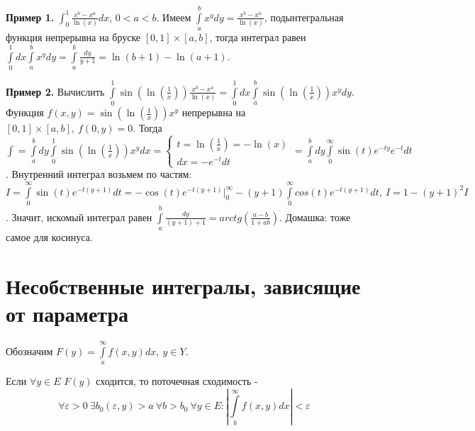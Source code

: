 \textbf{Пример 1.} $\int_{0}^{1} \frac{x^b-x^a}{\ln(x)}dx$, $0<a<b$.  
Имеем $\int\limits_{a}^{b} x^ydy=\frac{x^b-x^a}{\ln(x)}$, 
подынтегральная функция непрерывна на бруске $[0,1]\times[a,b]$, 
тогда интеграл равен $\int\limits_{0}^{1}dx\int\limits_{a}^{b}x^ydy=
\int\limits_{a}^{b}\frac{dy}{y+1}=\ln(b+1)-\ln(a+1)$.

\textbf{Пример 2.} Вычислить $\int\limits_{0}^{1}\sin(\ln(\frac{1}{x}))
\frac{x^b-x^a}{\ln(x)}=\int\limits_{0}^{1}dx \int\limits_{a}^{b}
\sin(\ln(\frac{1}{x}))x^ydy$. Функция $f(x,y)=\sin(\ln(\frac{1}{x}))x^y$ 
непрерывна на $[0,1]\times[a,b],~f(0,y)=0$. Тогда
$\int=\int\limits_{a}^{b}dy \int\limits_{0}^{1}\sin(\ln(\frac{1}{x}))x^ydx=
\begin{cases} t=\ln(\frac{1}{x})=-\ln(x)\\dx=-e^{-t}dt\end{cases}= 
\int\limits_{a}^{b} dy \int\limits_{0}^{\infty} \sin(t)e^{-ty}e^{-t}dt$. 
Внутренний интеграл возьмем по частям: $I=\int\limits_{0}^{\infty}
\sin(t)e^{-t(y+1)}dt=-\cos(t)e^{-t(y+1)}\big|_0^\infty
-(y+1)\int\limits_{0}^{\infty}cos(t)e^{-t(y+1)}dt,~I=1-(y+1)^2I$.
Значит, искомый интеграл равен 
$\int\limits_{a}^{b}\frac{dy}{(y+1)+1}=arctg\left( \frac{a-b}{1+ab}\right)$.
Домашка: тоже самое для косинуса.
\section{Несобственные интегралы, зависящие от параметра}
Обозначим $F(y)=\int\limits_{a}^{\infty}f(x,y)dx,~y\in Y$. 
\begin{defin}
Если $\forall y\in E$ $F(y)$ сходится, то поточечная сходимость - 
$$\forall \varepsilon>0~\exists b_0(\varepsilon,y)>a~
\forall b>b_0~\forall y\in E:\left| \int\limits_{b}^{\infty}f(x,y)dx\right|
<\varepsilon$$
\end{defin}

